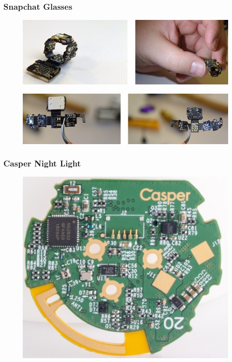 \documentclass[t]{beamer}
\begin{document}
\begin{frame}[t]
\frametitle{Snapchat Glasses}
\begin{figure}
	\includegraphics[width=\linewidth]{snapGlasses.jpg}
\end{figure}
\begin{figure}
	\includegraphics[width=\linewidth]{snapGlasses2.jpg}
\end{figure}

\end{frame}

\begin{frame}[t]
\frametitle{Casper Night Light}
\begin{figure}
	\includegraphics[width=0.7\linewidth]{casper.jpeg}
\end{figure}
\end{frame}
\end{document}
